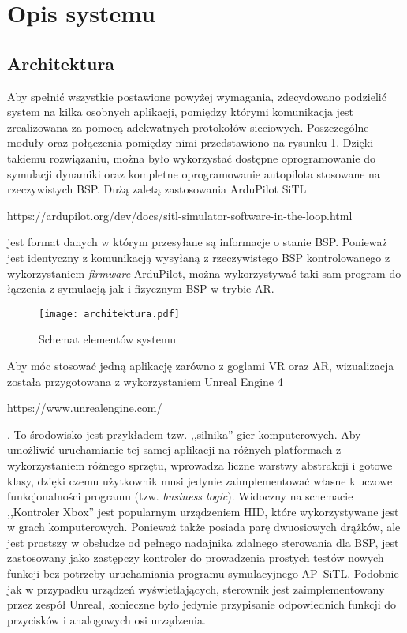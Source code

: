 \newpage
\section{Opis systemu}

\subsection{Architektura}
\label{sec:architektura}

Aby spełnić wszystkie postawione powyżej wymagania, zdecydowano podzielić system na kilka osobnych aplikacji, pomiędzy którymi komunikacja jest zrealizowana za pomocą adekwatnych protokołów sieciowych. Poszczególne moduły oraz połączenia pomiędzy nimi przedstawiono na rysunku \ref{fig:architektura}. Dzięki takiemu rozwiązaniu, można było wykorzystać dostępne oprogramowanie do symulacji dynamiki oraz kompletne oprogramowanie autopilota stosowane na rzeczywistych BSP. Dużą zaletą zastosowania ArduPilot SiTL \begin{todo}https://ardupilot.org/dev/docs/sitl-simulator-software-in-the-loop.html\end{todo} jest format danych w którym przesyłane są informacje o stanie BSP. Ponieważ jest identyczny z komunikacją wysyłaną z rzeczywistego BSP kontrolowanego z wykorzystaniem \emph
{firmware} ArduPilot, można wykorzystywać taki sam program do łączenia z symulacją jak i fizycznym BSP w trybie AR.

\begin{figure}[!h]
    \caption{Schemat elementów systemu}
    \label{fig:architektura}
    \centering \texttt{[image: architektura.pdf]}
\end{figure}

Aby móc stosować jedną aplikację zarówno z goglami VR oraz AR, wizualizacja została przygotowana z wykorzystaniem Unreal Engine 4 \begin{todo}https://www.unrealengine.com/\end{todo}. To środowisko jest przykładem tzw. ,,silnika'' gier komputerowych. Aby umożliwić uruchamianie tej samej aplikacji na różnych platformach z wykorzystaniem różnego sprzętu, wprowadza liczne warstwy abstrakcji i gotowe klasy, dzięki czemu użytkownik musi jedynie zaimplementować własne kluczowe funkcjonalności programu (tzw. \emph{business logic}). Widoczny na schemacie ,,Kontroler Xbox'' jest popularnym urządzeniem HID, które wykorzystywane jest w grach komputerowych. Ponieważ także posiada parę dwuosiowych drążków, ale jest prostszy w obsłudze od pełnego nadajnika zdalnego sterowania dla BSP, jest zastosowany jako zastępczy kontroler do prowadzenia prostych testów nowych funkcji bez potrzeby uruchamiania programu symulacyjnego AP~SiTL. Podobnie jak w przypadku urządzeń wyświetlających, sterownik jest zaimplementowany przez zespół Unreal, konieczne było jedynie przypisanie odpowiednich funkcji do przycisków i analogowych osi urządzenia.

